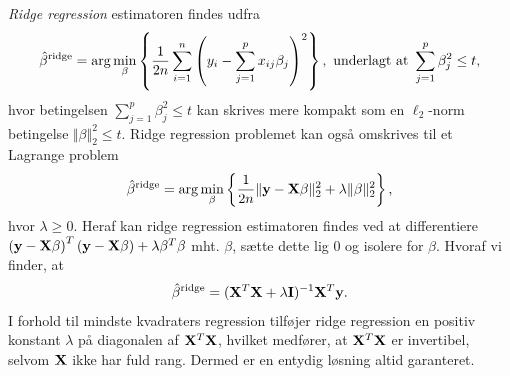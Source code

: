 \textit{Ridge regression} estimatoren findes udfra 
\begin{align} 
\hat{\beta}^\text{ridge} = \arg \min_{\beta} \cbr{\frac{1}{2n} \sum_{i=1}^n \del{y_i - \sum_{j=1}^p x_{ij} \beta_j}^2}, \ \text{underlagt at } \sum_{j=1}^p \beta_j^2 \leq t, \label{eq:2.7} 
\end{align} 
hvor betingelsen $\sum_{j=1}^p \beta_j^2 \leq t$ kan skrives mere kompakt som en \(\ell_2\)-norm betingelse $\Vert \beta \Vert_2^2 \leq t$.
Ridge regression problemet kan også omskrives til et Lagrange problem
\begin{align*}
\hat{\beta}^\text{ridge} = \arg \min_{\beta} \cbr{\frac{1}{2n} \Vert \y - \X \beta \Vert_2^2 + \lambda \Vert \beta \Vert_2^2},
\end{align*}
hvor $\lambda \geq 0$.
Heraf kan ridge regression estimatoren findes ved at differentiere \(\del{\y - \X \beta}^T \del{\y - \X \beta} + \lambda \beta^T \beta\) mht. $\beta$, sætte dette lig 0 og isolere for $\beta$. Hvoraf vi finder, at
\begin{align*} 
\hat{\beta}^\text{ridge} = (\mathbf{X}^T \mathbf{X} + \lambda \mathbf{I})^{-1} \mathbf{X}^T \mathbf{y}. 
\end{align*}  
I forhold til mindste kvadraters regression tilføjer ridge regression en positiv konstant $\lambda$ på diagonalen af $\mathbf{X}^T \mathbf{X}$, hvilket medfører, at \(\mathbf{X}^T \mathbf{X}\) er invertibel, selvom $\mathbf{X}$ ikke har fuld rang. 
Dermed er en entydig løsning altid garanteret. 

